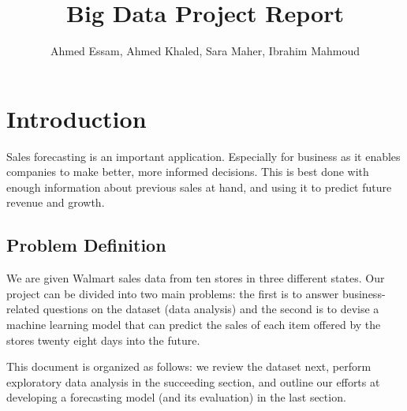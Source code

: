 \documentclass[12pt]{article}
\begin{document}
\title{Big Data Project Report}
\author{Ahmed Essam, Ahmed Khaled, Sara Maher, Ibrahim Mahmoud}

\maketitle


\tableofcontents
\clearpage
\setlength{\parindent}{0pt}
\setlength{\parskip}{\baselineskip}
\section{Introduction}
Sales forecasting is an important application. Especially for business as it enables companies to make better, more informed decisions. This is best done with enough information about previous sales at hand, and using it to predict future revenue and growth.

\subsection{Problem Definition}
We are given Walmart sales data from ten stores in three different states. Our project can be divided into two main problems: the first is to answer business-related questions on the dataset (data analysis) and the second is to devise a machine learning model that can predict the sales of each item offered by the stores twenty eight days into the future. 

This document is organized as follows: we review the dataset next, perform exploratory data analysis in the succeeding section, and outline our efforts at developing a forecasting model (and its evaluation) in the last section.
\end{document}
